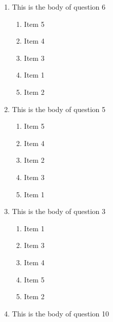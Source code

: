 \documentclass[amsfonts,bezier,leqno,fleqn,12pt,a4paper]{article}
\begin{document}
{{\begin{large}
\begin{enumerate}
\begin{enumerate}
\item  Item 3
\item  Item 2
\item  Item 5
\item  Item 4
\item  Item 1

\end{enumerate}
\newpage


\item This is the body of question 6
\vspace {0.3in}
\setcounter{equation}{0}

\begin{enumerate}
\item  Item 5
\item  Item 4
\item  Item 3
\item  Item 1
\item  Item 2

\end{enumerate}

\vspace {3.5cm}


\item This is the body of question 5
\vspace {0.3in}
\setcounter{equation}{0}

\begin{enumerate}
\item  Item 5
\item  Item 4
\item  Item 2
\item  Item 3
\item  Item 1

\end{enumerate}
\newpage


\item This is the body of question 3
\vspace {0.3in}
\setcounter{equation}{0}

\begin{enumerate}
\item  Item 1
\item  Item 3
\item  Item 4
\item  Item 5
\item  Item 2

\end{enumerate}

\vspace {3.5cm}


\item This is the body of question 10
\vspace {0.3in}
\setcounter{equation}{0}


\end{enumerate}
\end{large}}}
\end{document}
